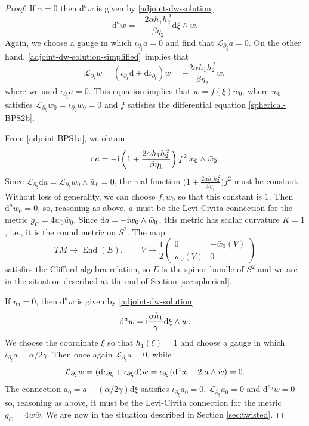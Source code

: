 \documentclass[10pt,a4paper]{amsart}
\newcommand{\1}{{\mathbb{1}}}
\newcommand{\lto}{\longrightarrow}
\def \d{\mathrm{d}}
\numberwithin{equation}{section}
\begin{document}
\begin{proof}
If $\gamma=0$ then $\d^aw$ is given by \eqref{adjoint-dw-solution}
\begin{equation}\label{adjoint-dw-solution-simplified}
\d^a w = -\frac{2\alpha h_1h_2^{\,2}}{\beta \eta_2}\d\xi\wedge w.
\end{equation}
Again, we choose a gauge in which $\iota_{\partial_\xi}a=0$ and find that $\mathcal{L}_{\partial_\xi}a=0$. On the other hand, \eqref{adjoint-dw-solution-simplified}~implies that
\begin{equation*}
\mathcal{L}_{\partial_\xi}w = (\iota_{\partial_\xi}\d + \d\iota_{\partial_\xi})w=-\frac{2\alpha h_1h_2^{\,2}}{\beta\eta_2}w,
\end{equation*}
where we used $\iota_{\partial_\xi}a=0$. This equation implies that $w=f(\xi)w_0$, where $w_0$ satisfies $\mathcal{L}_{\partial_\xi}w_0=\iota_{\partial_\xi}w_0=0$ and $f$ satisfies the differential equation \eqref{spherical-BPS2b}.

From \eqref{adjoint-BPS1a}, we obtain
\begin{equation*}
\d a = -{\rm i}\left(1+\frac{2\alpha h_1 h_2^{\,2}}{\beta\eta_1}\right)f^2\,w_0\wedge\bar{w}_0.
\end{equation*}
Since $\mathcal{L}_{\partial_\xi}\d a = \mathcal{L}_{\partial_\xi}w_0\wedge\bar{w}_0=0$, the real function $\big(1+\frac{2\alpha h_1 h_2^{\,2}}{\beta\eta_1}\big)f^2$ must be constant. Without loss of generality, we can choose $f,w_0$ so that this constant is 1. Then $\d^a w_0=0$, so, reasoning as above, $a$ must be the Levi-Civita connection for the metric $g_C=4w_0\bar{w}_0$. Since $\d a=-{\rm i}w_0\wedge\bar{w}_0$, this metric has scalar curvature $K=1$, i.e., it is the round metric on $S^2$. The map
\begin{equation*}
TM\lto \operatorname{End}(E), \qquad V\mapsto \frac12\begin{pmatrix}0&-\bar{w}_0(V)\\w_0(V)&0\end{pmatrix}
\end{equation*}
satisfies the Clifford algebra relation, so $E$ is the spinor bundle of $S^2$ and we are in the situation described at the end of Section \ref{sec:spherical}.

If $\eta_2=0$, then $\d^aw$ is given by \eqref{adjoint-dw-solution}
\begin{equation}\label{adjoint-dw-solution-simplified2}
\d^a w = {\rm i}\frac{\alpha h_1}{\gamma}\d\xi\wedge w.
\end{equation}
We choose the coordinate $\xi$ so that $h_1(\xi)=1$ and choose a gauge in which $\iota_{\partial_\xi}a=\alpha /2\gamma$. Then once again $\mathcal{L}_{\partial_\xi}a=0$, while
\begin{equation*}
\mathcal{L}_{\partial_\xi}w = (\d\iota_{\partial\xi}+\iota_{\partial\xi}\d)w = \iota_{\partial_\xi}(\d^aw - 2{\rm i}a\wedge w) = 0.
\end{equation*}
The connection $a_0=a-(\alpha/2\gamma)\d\xi$ satisfies $\iota_{\partial_\xi} a_0=0$, $\mathcal{L}_{\partial_\xi}a_0=0$ and $\d^{a_0}w=0$ so, reasoning as above, it must be the Levi-Civita connection for the metric $g_C=4w\bar{w}$. We are now in the situation described in Section \ref{sec:twisted}.


\end{proof}
\end{document}
